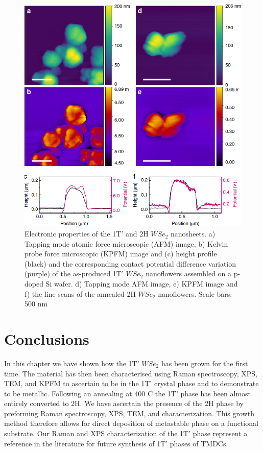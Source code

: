\begin{figure}[H]
	\begin{center}
		\includegraphics[scale=0.3]{1T'/ElectronicProperties.png}
		\caption{Electronic properties of the 1T’ and 2H $WSe_2$ nanosheets. a) Tapping mode atomic force microscopic (AFM) image, b) Kelvin probe force microscopic (KPFM) image and (c) height profile (black) and the corresponding contact potential difference variation (purple) of the as-produced 1T’ $WSe_2$ nanoflowers assembled on a p-doped Si wafer. d) Tapping mode AFM image, e) KPFM image and f) the line scans of the annealed 2H $WSe_2$ nanoflowers. Scale bars: 500 nm}
		\label{fig:1T'ElectronicProperties}
	\end{center}
\end{figure}

\section{Conclusions}

In this chapter we have shown how the 1T' $WSe_2$ has been grown for the first time. The material has then been characterised using Raman spectroscopy, XPS, TEM, and KPFM to ascertain to be in the 1T’ crystal phase and to demonstrate  to be metallic. Following an annealing at 400 {\degree}C the 1T' phase has been almost entirely converted to 2H. We have ascertain the presence of the 2H phase by preforming Raman spectroscopy, XPS, TEM, and characterization. This growth method therefore allows for direct deposition of metastable phase on a functional substrate. Our Raman and XPS characterization of the 1T’ phase represent a reference in the literature for future synthesis of 1T’ phases of TMDCs.